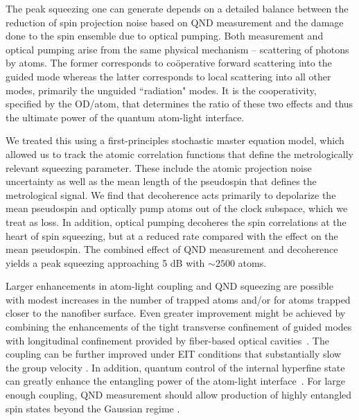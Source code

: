 \documentclass[preprint, aps,pra,onecolumn]{revtex4-1} %
\begin{document}
The peak squeezing one can generate depends on a detailed balance between the reduction of spin projection noise based on QND measurement and the damage done to the spin ensemble due to optical pumping.  
Both measurement and optical pumping arise from the same physical mechanism -- scattering of photons by atoms.  
The former corresponds to co\"{o}perative forward scattering into the guided mode whereas the latter corresponds to local scattering into all other modes, primarily the unguided ``radiation" modes.   
It is the cooperativity, specified by the OD/atom, that determines the ratio of these two effects and thus the ultimate power of the quantum atom-light interface. 

We treated this using a first-principles stochastic master equation model, which allowed us to track the atomic correlation functions that define the metrologically relevant squeezing parameter.  
These include the atomic projection noise uncertainty as well as the mean length of the pseudospin that defines the metrological signal.  
We find that decoherence acts primarily to depolarize the mean pseudospin and optically pump atoms out of the clock subspace, which we treat as loss.  In addition, optical pumping decoheres the spin correlations at the heart of spin squeezing, but at a reduced rate compared with the effect on the mean pseudospin.  
The combined effect of QND measurement and decoherence yields a peak squeezing approaching 5 dB with $\sim 2500$ atoms. 



Larger enhancements in atom-light coupling and QND squeezing are possible with modest increases in the number of trapped atoms and/or for atoms trapped closer to the nanofiber surface.  
Even greater improvement might be achieved by combining the enhancements of the tight transverse confinement of guided modes with longitudinal confinement provided by fiber-based optical cavities~\cite{le_kien_intracavity_2009, wuttke_nanofiber_2012, yalla_cavity_2014, bohnet_reduced_2014,nayak_optical_2014}.  
The coupling can be further improved under EIT conditions that substantially slow the group velocity \cite{gouraud_demonstration_2015, sayrin_storage_2015, kumar_autler-townes_2015, le_kien_electromagnetically_2015}. 
In addition, quantum control of the internal hyperfine state \cite{smith_quantum_2013-1} can greatly enhance the entangling power of the atom-light interface~\cite{trail_strongly_2010, norris_enhanced_2012}. 
For large enough coupling, QND measurement should allow production of highly entangled spin states beyond the Gaussian regime \cite{stockton_deterministic_2004, mcconnell_entanglement_2015}.
\end{document}
